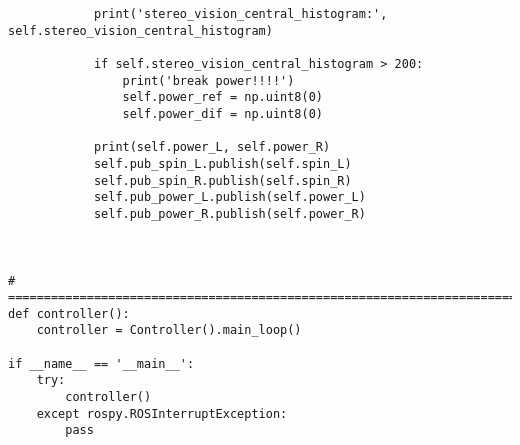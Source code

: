 \begin{lstlisting}
            print('stereo_vision_central_histogram:', self.stereo_vision_central_histogram)

            if self.stereo_vision_central_histogram > 200:
                print('break power!!!!')
                self.power_ref = np.uint8(0)
                self.power_dif = np.uint8(0)

            print(self.power_L, self.power_R)
            self.pub_spin_L.publish(self.spin_L)
            self.pub_spin_R.publish(self.spin_R)
            self.pub_power_L.publish(self.power_L)
            self.pub_power_R.publish(self.power_R)



# ======================================================================================================================
def controller():
    controller = Controller().main_loop()

if __name__ == '__main__':
    try:
        controller()
    except rospy.ROSInterruptException:
        pass

\end{lstlisting}
\pagebreak 